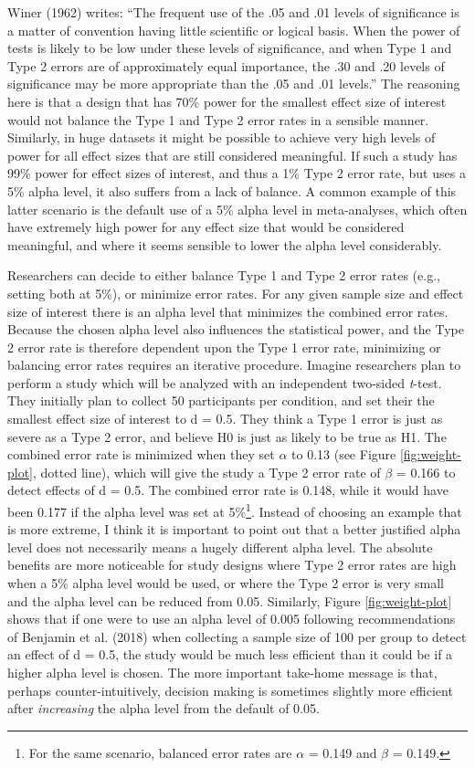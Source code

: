 \documentclass[,jou,floatsintext]{apa6}
\let\rmarkdownfootnote\footnote%
\def\footnote{\protect\rmarkdownfootnote}
\begin{document}
Winer (1962) writes: \enquote{The frequent use of the .05 and .01 levels of significance is a matter of convention having little scientific or logical basis. When the power of tests is likely to be low under these levels of significance, and when Type 1 and Type 2 errors are of approximately equal importance, the .30 and .20 levels of significance may be more appropriate than the .05 and .01 levels.} The reasoning here is that a design that has 70\% power for the smallest effect size of interest would not balance the Type 1 and Type 2 error rates in a sensible manner. Similarly, in huge datasets it might be possible to achieve very high levels of power for all effect sizes that are still considered meaningful. If such a study has 99\% power for effect sizes of interest, and thus a 1\% Type 2 error rate, but uses a 5\% alpha level, it also suffers from a lack of balance. A common example of this latter scenario is the default use of a 5\% alpha level in meta-analyses, which often have extremely high power for any effect size that would be considered meaningful, and where it seems sensible to lower the alpha level considerably.

Researchers can decide to either balance Type 1 and Type 2 error rates (e.g., setting both at 5\%), or minimize error rates. For any given sample size and effect size of interest there is an alpha level that minimizes the combined error rates. Because the chosen alpha level also influences the statistical power, and the Type 2 error rate is therefore dependent upon the Type 1 error rate, minimizing or balancing error rates requires an iterative procedure. Imagine researchers plan to perform a study which will be analyzed with an independent two-sided \emph{t}-test. They initially plan to collect 50 participants per condition, and set their the smallest effect size of interest to d = 0.5. They think a Type 1 error is just as severe as a Type 2 error, and believe H0 is just as likely to be true as H1. The combined error rate is minimized when they set \(\alpha\) to 0.13 (see Figure \ref{fig:weight-plot}, dotted line), which will give the study a Type 2 error rate of \(\beta\) = 0.166 to detect effects of d = 0.5. The combined error rate is 0.148, while it would have been 0.177 if the alpha level was set at 5\%\footnote{For the same scenario, balanced error rates are \(\alpha\) = 0.149 and \(\beta\) = 0.149.}. Instead of choosing an example that is more extreme, I think it is important to point out that a better justified alpha level does not necessarily means a hugely different alpha level. The absolute benefits are more noticeable for study designs where Type 2 error rates are high when a 5\% alpha level would be used, or where the Type 2 error is very small and the alpha level can be reduced from 0.05. Similarly, Figure \ref{fig:weight-plot} shows that if one were to use an alpha level of 0.005 following recommendations of Benjamin et al. (2018) when collecting a sample size of 100 per group to detect an effect of d = 0.5, the study would be much less efficient than it could be if a higher alpha level is chosen. The more important take-home message is that, perhaps counter-intuitively, decision making is sometimes slightly more efficient after \emph{increasing} the alpha level from the default of 0.05.
\end{document}

